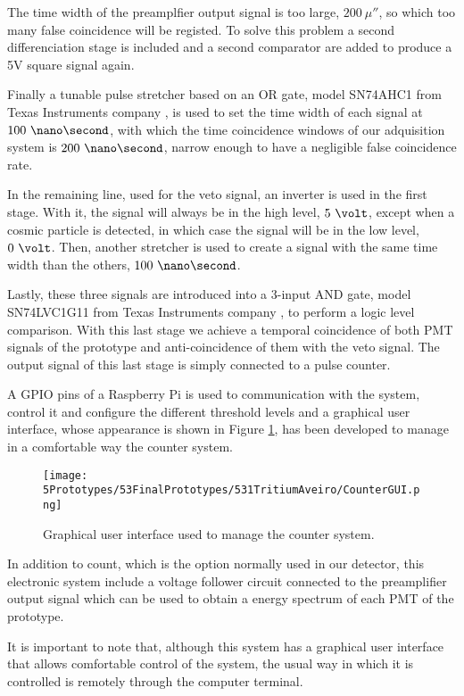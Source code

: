 The time width of the preamplfier output signal is too large, $200~\mu\second$, so which too many false coincidence will be registed. To solve this problem a second differenciation stage is included and a second comparator are added to produce a 5V square signal again.

Finally a tunable pulse stretcher based on an OR gate, model SN74AHC1 from Texas Instruments company \cite{Stretcher}, is used to set the time width of each signal at $100~\nano\second$, with which the time coincidence windows of our adquisition system is $200~\nano\second$, narrow enough to have a negligible false coincidence rate.

In the remaining line, used for the veto signal, an inverter is used in the first stage. With it, the signal will always be in the high level, $5~\volt$, except when a cosmic particle is detected, in which case the signal will be in the low level, $0~\volt$. Then, another stretcher is used to create a signal with the same time width than the others, $100~\nano\second$.

Lastly, these three signals are introduced into a 3-input AND gate, model SN74LVC1G11 from Texas Instruments company \cite{ANDGate}, to perform a logic level comparison. With this last stage we achieve a temporal coincidence of both PMT signals of the prototype and anti-coincidence of them with the veto signal. The output signal of this last stage is simply connected to a pulse counter. 

A GPIO pins of a Raspberry Pi is used to communication with the system, control it and configure the different threshold levels and a graphical user interface, whose appearance is shown in Figure \ref{fig:GUIcounts}, has been developed to manage in a comfortable way the counter system.

 \begin{figure}[h]
\centering
\texttt{[image: 5Prototypes/53FinalPrototypes/531TritiumAveiro/CounterGUI.png]}
\caption{Graphical user interface used to manage the counter system. \label{fig:GUIcounts}}
\end{figure}

In addition to count, which is the option normally used in our detector, this electronic system include a voltage follower circuit connected to the preamplifier output signal which can be used to obtain a energy spectrum of each PMT of the prototype.

It is important to note that, although this system has a graphical user interface that allows comfortable control of the system, the usual way in which it is controlled is remotely through the computer terminal.

